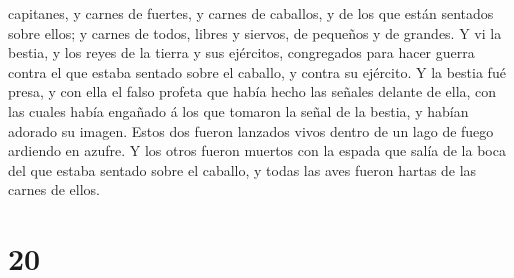 capitanes, y carnes de fuertes, y carnes de caballos, y de los que están
sentados sobre ellos; y carnes de todos, libres y siervos, de pequeños y
de grandes.  Y vi la bestia, y los reyes de la tierra y sus
ejércitos, congregados para hacer guerra contra el que estaba sentado
sobre el caballo, y contra su ejército.  Y la bestia fué
presa, y con ella el falso profeta que había hecho las señales delante
de ella, con las cuales había engañado á los que tomaron la señal de la
bestia, y habían adorado su imagen. Estos dos fueron lanzados vivos
dentro de un lago de fuego ardiendo en azufre.  Y los otros
fueron muertos con la espada que salía de la boca del que estaba sentado
sobre el caballo, y todas las aves fueron hartas de las carnes de ellos.

\hypertarget{section-19}{%
\section{20}\label{section-19}}


